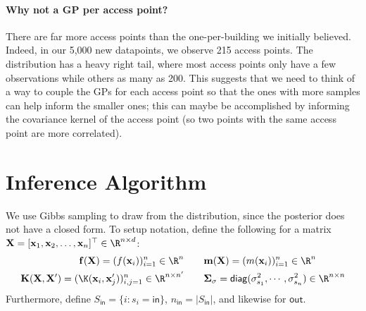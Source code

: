 \documentclass{article}
\newcommand{\bl}{\mathbf}
\newcommand{\bs}{\boldsymbol}
\begin{document}
\paragraph{Why not a GP per access point?} There are far more access points than the one-per-building we initially believed. Indeed, in our 5,000 new datapoints, we observe 215 access points. The distribution has a heavy right tail, where most access points only have a few observations while others as many as 200. This suggests that we need to think of a way to couple the GPs for each access point so that the ones with more samples can help inform the smaller ones; this can maybe be accomplished by informing the covariance kernel of the access point (so two points with the same access point are more correlated).

\section{Inference Algorithm}

We use Gibbs sampling to draw from the distribution, since the posterior does not have a closed form. To setup notation, define the following for a matrix $\bl{X} = [\bl{x}_1, \bl{x}_2, \dots, \bl{x}_n]^\top \in \R^{n \times d}$:
\begin{align*}
    \bl{f}(\bl{X}) = (f(\bl{x}_i))_{i = 1} ^n \in \R^n
    &\qquad 
    \bl{m}(\bl{X}) = (m(\bl{x}_i))_{i = 1} ^n \in \R^n
    \\
    \bl{K}(\bl{X},\bl{X'}) = (\K(\bl{x}_i, \bl{x}'_j))_{i,j = 1}^n \in \R^{n \times n'} 
    &\qquad 
    \bs\Sigma_{\sigma} = \mathsf{diag}(\sigma_{s_1}^2, \cdots, \sigma_{s_n}^2) \in \R^{n \times n}
\end{align*}
Furthermore, define $S_{\mathsf{in}} = \{i: s_i = \mathsf{in}\}$, $n_\mathsf{in} = |S_\mathsf{in}|$, and likewise for $\mathsf{out}$. 
\end{document}
